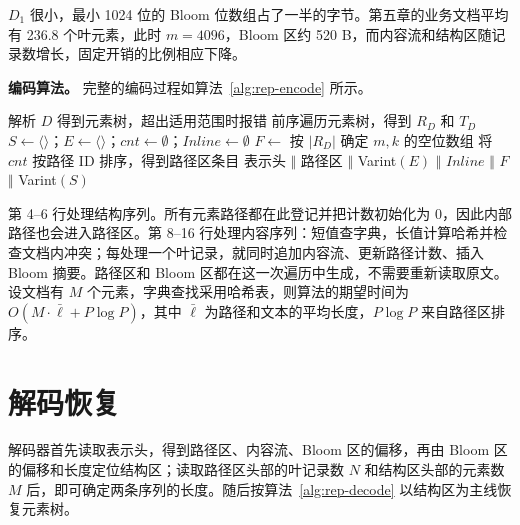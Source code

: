 $D_1$ 很小，最小 1024 位的 Bloom 位数组占了一半的字节。第五章的业务文档平均有 236.8 个叶元素，此时 $m=4096$，Bloom 区约 520 B，而内容流和结构区随记录数增长，固定开销的比例相应下降。

\textbf{编码算法。} 完整的编码过程如算法~\ref{alg:rep-encode} 所示。

\begin{algorithm}[htbp]
\caption{结构感知编码}
\label{alg:rep-encode}
解析 $D$ 得到元素树，超出适用范围时报错\;
前序遍历元素树，得到 $R_D$ 和 $T_D$\;
$S\leftarrow\langle\rangle$；$E\leftarrow\langle\rangle$；$\mathit{cnt}\leftarrow\emptyset$；$\mathit{Inline}\leftarrow\emptyset$\;
$F\leftarrow$ 按 $|R_D|$ 确定 $m,k$ 的空位数组\;
将 $\mathit{cnt}$ 按路径 ID 排序，得到路径区条目\;
\Return 表示头 $\Vert$ 路径区 $\Vert$ Varint$(E)$ $\Vert$ $\mathit{Inline}$ $\Vert$ $F$ $\Vert$ Varint$(S)$\;
\end{algorithm}

第 4--6 行处理结构序列。所有元素路径都在此登记并把计数初始化为 0，因此内部路径也会进入路径区。第 8--16 行处理内容序列：短值查字典，长值计算哈希并检查文档内冲突；每处理一个叶记录，就同时追加内容流、更新路径计数、插入 Bloom 摘要。路径区和 Bloom 区都在这一次遍历中生成，不需要重新读取原文。设文档有 $M$ 个元素，字典查找采用哈希表，则算法的期望时间为 $O(M\cdot\bar\ell+P\log P)$，其中 $\bar\ell$ 为路径和文本的平均长度，$P\log P$ 来自路径区排序。

\section{解码恢复}
\label{sec:rep-decode}

解码器首先读取表示头，得到路径区、内容流、Bloom 区的偏移，再由 Bloom 区的偏移和长度定位结构区；读取路径区头部的叶记录数 $N$ 和结构区头部的元素数 $M$ 后，即可确定两条序列的长度。随后按算法~\ref{alg:rep-decode} 以结构区为主线恢复元素树。

